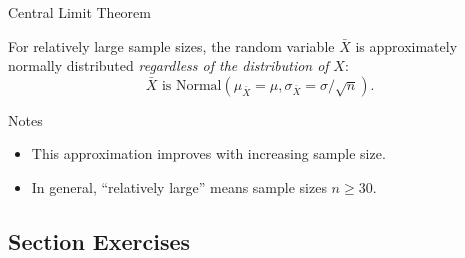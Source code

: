 \documentclass[
]{book}
\providecommand{\tightlist}{%
  \setlength{\itemsep}{0pt}\setlength{\parskip}{0pt}}
\begin{document}
Central Limit Theorem

For relatively large sample sizes, the random variable \(\bar{X}\) is approximately normally distributed \emph{regardless of the distribution of} \(X\): \[\bar{X}\text{ is Normal}(\mu_{\bar{X}}=\mu, \sigma_{\bar{X}}=\sigma/\sqrt{n}).\]

Notes

\begin{itemize}
\tightlist
\item
  This approximation improves with increasing sample size.
\item
  In general, ``relatively large'' means sample sizes \(n \ge 30\).
\end{itemize}

\subsection*{Section Exercises}\label{section-exercises-16}
\end{document}
